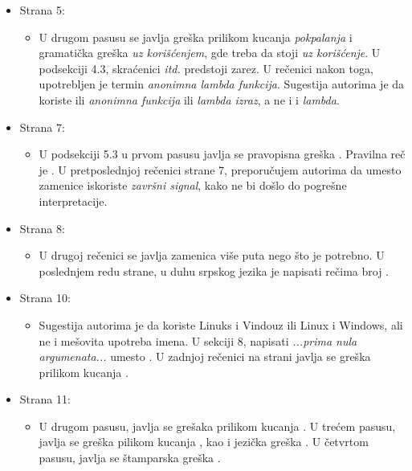 \documentclass[a4paper]{report}
\begin{document}
\begin{itemize}
\begin{itemize}
    \end{itemize}
    \item Strana 5:
    \begin{itemize}
        \item U drugom pasusu se javlja greška prilikom kucanja \textit{pokpalanja} i gramatička greška \textit{uz korišćenjem}, gde treba da stoji \textit{uz korišćenje}. U podsekciji 4.3, skraćenici \textit{itd.} predstoji zarez. U rečenici nakon toga, upotrebljen je termin \textit{anonimna lambda funkcija}. Sugestija autorima je da koriste ili \textit{anonimna funkcija} ili \textit{lambda izraz}, a ne i  i \textit{lambda}. 
    \end{itemize}
    \item Strana 7:
    \begin{itemize}
        \item U podsekciji 5.3 u prvom pasusu javlja se pravopisna greška . Pravilna reč je . U pretposlednjoj rečenici strane 7, preporučujem autorima da umesto zamenice  iskoriste \textit{završni signal}, kako ne bi došlo do pogrešne interpretacije.
    \end{itemize}
    \item Strana 8:
    \begin{itemize}
        \item U drugoj rečenici se javlja zamenica  više puta nego što je potrebno. U poslednjem redu strane, u duhu srpskog jezika je napisati rečima broj .
    \end{itemize}
    \item Strana 10:
    \begin{itemize}
        \item Sugestija autorima je da koriste Linuks i Vindouz ili Linux i Windows, ali ne i mešovita upotreba imena.
        U sekciji 8, napisati \textit{...prima nula argumenata...} umesto . U zadnjoj rečenici na strani javlja se greška prilikom kucanja .
    \end{itemize}
    \item Strana 11:
    \begin{itemize}
        \item U drugom pasusu, javlja se grešaka prilikom kucanja . U trećem pasusu, javlja se greška pilikom kucanja , kao i jezička greška . U četvrtom pasusu, javlja se štamparska greška .
    \end{itemize}
\end{itemize}
\end{document}

